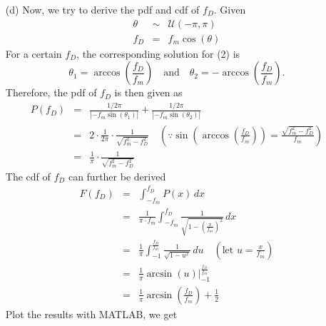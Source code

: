 \begin{itemize}
\begin{figure}[H]
    \end{figure}
    \item[(d)] Now, we try to derive the pdf and cdf of $f_D$. Given 
    \begin{eqnarray}
        \theta & \sim & \mathcal{U}(-\pi, \pi) \\
        f_D    &  =   & f_m \cos \left(\theta\right)
    \end{eqnarray}
    For a certain $f_D$, the corresponding solution for (2) is 
    \begin{equation*}
        \theta_1 = \arccos \left(\frac{f_D}{f_m} \right) \quad \text{and} \quad \theta_2 = - \arccos \left(\frac{f_D}{f_m} \right).
    \end{equation*}
    Therefore, the pdf of $f_D$ is then given as
    \begin{eqnarray*}
        P(f_D) & = & \frac{1/2\pi}{\left|-f_m \sin\left(\theta_1\right)\right|} + \frac{1/2\pi}{\left|-f_m \sin\left(\theta_2\right)\right|} \\
               & = & 2 \cdot \frac{1}{2\pi} \cdot \frac{1}{\sqrt{f_m^2 - f_D^2}} \quad \left(\because \sin\left(\arccos \left(\frac{f_D}{f_m} \right)\right) = \frac{\sqrt{f_m^2 - f_D^2}}{f_m} \right)\\
               & = & \frac{1}{\pi} \cdot \frac{1}{\sqrt{f_m^2 - f_D^2}}
    \end{eqnarray*}
    The cdf of $f_D$ can further be derived
    \begin{eqnarray*}
        F(f_D) & = & \int_{-f_m}^{f_D} P(x) \, dx \\
               & = & \frac{1}{\pi \cdot f_m} \int_{-f_m}^{f_D} \frac{1}{\sqrt{1 - \left(\frac{x}{f_m}\right)^{2}}} \, dx \\
               & = & \frac{1}{\pi} \int_{-1}^{\frac{f_D}{f_m}} \frac{1}{\sqrt{1 - u^{2}}} \, du \quad \left(\text{let } u = \frac{x}{f_m}\right) \\
               & = & \frac{1}{\pi} \arcsin \left( u \right) \Bigg|_{-1}^{\frac{f_D}{f_m}} \\
               & = & \frac{1}{\pi} \arcsin\left(\frac{f_D}{f_m}\right) + \frac{1}{2}
    \end{eqnarray*}
    Plot the results with MATLAB, we get
    \begin{figure}[H]
        \centering

\end{figure}
\end{itemize}
